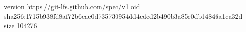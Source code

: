 version https://git-lfs.github.com/spec/v1
oid sha256:1715b938fd8af72b6eae0d735730954dd4cdcd2b490b3a85c0db14846a1ca32d
size 104276
